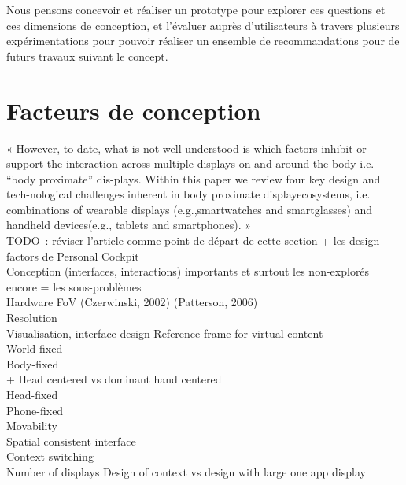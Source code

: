 Nous pensons concevoir et réaliser un prototype pour explorer ces questions et ces dimensions de conception, et l'évaluer auprès d'utilisateurs à travers plusieurs expérimentations pour pouvoir réaliser un ensemble de recommandations pour de futurs travaux suivant le concept.



\section*{Facteurs de conception}
« However, to date, what is not well understood is which factors inhibit or support the interaction across multiple displays on and around the body i.e. “body proximate” dis-plays. Within this paper we review four key design and tech-nological challenges inherent in body proximate displayecosystems, i.e. combinations of wearable displays (e.g.,smartwatches and smartglasses) and handheld devices(e.g., tablets and smartphones). » \cite{GrubertKranzQuigley2015} \\
TODO~: réviser l'article comme point de départ de cette section + les design factors de Personal Cockpit \\

Conception (interfaces, interactions) importants et surtout les non-explorés encore = les sous-problèmes \\
	Hardware
        FoV (Czerwinski, 2002) (Patterson, 2006) \cite{KishishitaKiyokawaOrloskyEtAl2014} \\

        Resolution \\

    Visualisation, interface design
        Reference frame for virtual content \\
            World-fixed \cite{EnsFinneganIrani2014} \\
            Body-fixed \cite{EnsFinneganIrani2014} \\
                + Head centered vs dominant hand centered \\
            Head-fixed \cite{EnsFinneganIrani2014} \\
            Phone-fixed \\
            Movability \cite{EnsHincapie-RamosIrani2014} \\
            Spatial consistent interface \cite{LiDearmanTruong2009} \\

        Context switching \\
            Number of displays \cite{RashidNacentaQuigley2012} \cite{CauchardLoechtefeldFraserEtAl2012}
            Design of context vs design with large one app display \cite{BallNorth2008}

